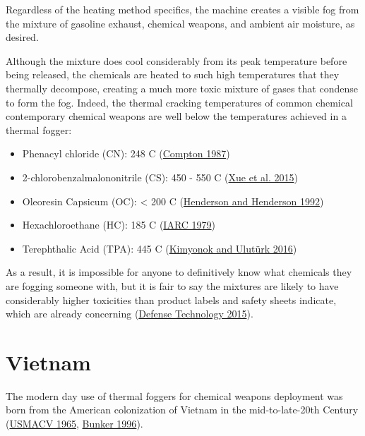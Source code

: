 \documentclass[
  11pt,
]{krantz}
\providecommand{\tightlist}{%
  \setlength{\itemsep}{0pt}\setlength{\parskip}{0pt}}
\begin{document}
Regardless of the heating method specifics, the machine creates a visible fog from the mixture of gasoline exhaust, chemical weapons, and ambient air moisture, as desired.

Although the mixture does cool considerably from its peak temperature before being released, the chemicals are heated to such high temperatures that they thermally decompose, creating a much more toxic mixture of gases that condense to form the fog.
Indeed, the thermal cracking temperatures of common chemical contemporary chemical weapons are well below the temperatures achieved in a thermal fogger:

\begin{itemize}
\tightlist
\item
  Phenacyl chloride (CN): 248 C (\protect\hyperlink{ref-Compton1987}{Compton 1987})
\item
  2-chlorobenzalmalononitrile (CS): 450 - 550 C (\protect\hyperlink{ref-Xueetal2015}{Xue et al. 2015})
\item
  Oleoresin Capsicum (OC): \textless{} 200 C (\protect\hyperlink{ref-HendersonandHenderson1992}{Henderson and Henderson 1992})
\item
  Hexachloroethane (HC): 185 C (\protect\hyperlink{ref-IARC1979}{IARC 1979})
\item
  Terephthalic Acid (TPA): 445 C (\protect\hyperlink{ref-KimyonokandUluturk2016}{Kimyonok and Ulutürk 2016})
\end{itemize}

As a result, it is impossible for anyone to definitively know what chemicals they are fogging someone with, but it is fair to say the mixtures are likely to have considerably higher toxicities than product labels and safety sheets indicate, which are already concerning (\protect\hyperlink{ref-defteccs}{Defense Technology 2015}).

\hypertarget{Vietnam}{%
\chapter{Vietnam}\label{Vietnam}}

The modern day use of thermal foggers for chemical weapons deployment was born from the American colonization of Vietnam in the mid-to-late-20th Century (\protect\hyperlink{ref-USMACV1965}{USMACV 1965}, \protect\hyperlink{ref-Bunker1996}{Bunker 1996}).
\end{document}
